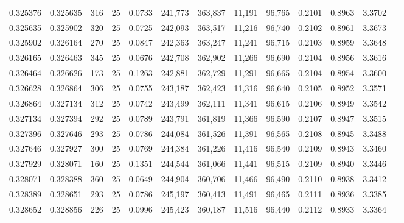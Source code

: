\begin{tabular}{rrrrrrrrrrrrr}
0.325376 & 0.325635 &   316 &  25 &                                     0.0733 & 241,773 & 363,837 &  11,191 &  96,765 & 0.2101 & 0.8963 & 3.3702 \\
0.325635 & 0.325902 &   320 &  25 &                                     0.0725 & 242,093 & 363,517 &  11,216 &  96,740 & 0.2102 & 0.8961 & 3.3673 \\
0.325902 & 0.326164 &   270 &  25 &                                     0.0847 & 242,363 & 363,247 &  11,241 &  96,715 & 0.2103 & 0.8959 & 3.3648 \\
0.326165 & 0.326463 &   345 &  25 &                                     0.0676 & 242,708 & 362,902 &  11,266 &  96,690 & 0.2104 & 0.8956 & 3.3616 \\
0.326464 & 0.326626 &   173 &  25 &                                     0.1263 & 242,881 & 362,729 &  11,291 &  96,665 & 0.2104 & 0.8954 & 3.3600 \\
0.326628 & 0.326864 &   306 &  25 &                                     0.0755 & 243,187 & 362,423 &  11,316 &  96,640 & 0.2105 & 0.8952 & 3.3571 \\
0.326864 & 0.327134 &   312 &  25 &                                     0.0742 & 243,499 & 362,111 &  11,341 &  96,615 & 0.2106 & 0.8949 & 3.3542 \\
0.327134 & 0.327394 &   292 &  25 &                                     0.0789 & 243,791 & 361,819 &  11,366 &  96,590 & 0.2107 & 0.8947 & 3.3515 \\
0.327396 & 0.327646 &   293 &  25 &                                     0.0786 & 244,084 & 361,526 &  11,391 &  96,565 & 0.2108 & 0.8945 & 3.3488 \\
0.327646 & 0.327927 &   300 &  25 &                                     0.0769 & 244,384 & 361,226 &  11,416 &  96,540 & 0.2109 & 0.8943 & 3.3460 \\
0.327929 & 0.328071 &   160 &  25 &                                     0.1351 & 244,544 & 361,066 &  11,441 &  96,515 & 0.2109 & 0.8940 & 3.3446 \\
0.328071 & 0.328388 &   360 &  25 &                                     0.0649 & 244,904 & 360,706 &  11,466 &  96,490 & 0.2110 & 0.8938 & 3.3412 \\
0.328389 & 0.328651 &   293 &  25 &                                     0.0786 & 245,197 & 360,413 &  11,491 &  96,465 & 0.2111 & 0.8936 & 3.3385 \\
0.328652 & 0.328856 &   226 &  25 &                                     0.0996 & 245,423 & 360,187 &  11,516 &  96,440 & 0.2112 & 0.8933 & 3.3364 \\

\end{tabular}
